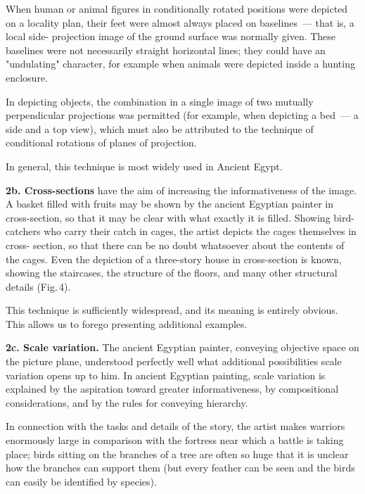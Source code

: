 When human or animal figures in conditionally rotated positions were depicted on a
locality plan, their feet were almost always placed on baselines~--- that is, a local side-
projection image of the ground surface was normally given. These baselines were not
necessarily straight horizontal lines; they could have an "undulating" character, for
example when animals were depicted inside a hunting enclosure.

In depicting objects, the combination in a single image of two mutually perpendicular
projections was permitted (for example, when depicting a bed~--- a side and a top view),
which must also be attributed to the technique of conditional rotations of planes of
projection.

In general, this technique is most widely used in Ancient Egypt.



\medskip

\noindent\textbf{2b. Cross-sections} have the aim of increasing the informativeness of
the image. A basket filled with fruits may be shown by the ancient Egyptian painter in
cross-section, so that it may be clear with what exactly it is filled. Showing bird-
catchers who carry their catch in cages, the artist depicts the cages themselves in cross-
section, so that there can be no doubt whatsoever about the contents of the cages. Even
the depiction of a three-story house in cross-section is known, showing the staircases,
the structure of the floors, and many other structural details (Fig.\,4).


This technique is sufficiently widespread, and its meaning is entirely obvious. This
allows us to forego presenting additional examples.

\medskip

\noindent\textbf{2c. Scale variation.} The ancient Egyptian painter, conveying objective
space on the picture plane, understood perfectly well what additional possibilities
scale variation opens up to him. In ancient Egyptian painting, scale variation is
explained by the aspiration toward greater informativeness, by compositional
considerations, and by the rules for conveying hierarchy.

In connection with the tasks and details of the story, the artist makes warriors
enormously large in comparison with the fortress near which a battle is taking place;
birds sitting on the branches of a tree are often so huge that it is unclear how the
branches can support them (but every feather can be seen and the birds can easily be
identified by species).

